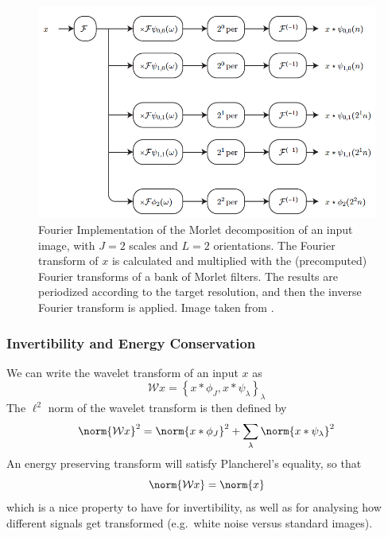   \begin{figure}
    \centering
      \includegraphics[width=\textwidth]{litreview/images/morlet_fourier_process.png}
      \caption[Fourier Implementation of the Morlet decomposition of an input
              image]
              {Fourier Implementation of the Morlet decomposition of an input
              image, with $J=2$ scales and $L=2$ orientations. The Fourier
              transform of $x$ is calculated and multiplied with the
              (precomputed) Fourier transforms of a bank of Morlet filters. The
              results are periodized according to the target resolution, and
              then the inverse Fourier transform is applied. Image taken from
              \citep{sifre_rigid-motion_2014-1}.}
      \label{fig:ch2:morlet_fourier_process}
  \end{figure}

\subsubsection{Invertibility and Energy Conservation}
  We can write the wavelet transform of an input $x$ as 
  \begin{equation}
    \mathcal{W}x = \left\{x \ast \phi_J, x \ast \psi_{\lambda}
    \right\}_{\lambda}
  \end{equation}
  The $\ell^2$ norm of the wavelet transform is then defined by
  \begin{equation}
    \norm{\mathcal{W}x}^2 = \norm{x\ast\phi_J}^2 + \sum_{\lambda}\norm{x \ast
      \psi_\lambda}^2
  \end{equation}
  An energy preserving transform will satisfy Plancherel's equality, so that
  \begin{equation}
    \norm{\mathcal{W}x} = \norm{x}
  \end{equation}
  which is a nice property to have for invertibility, as well as for analysing
  how different signals get transformed (e.g.\ white noise versus standard
  images).
  
